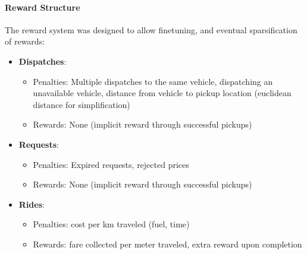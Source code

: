 \documentclass[11pt]{article}
\begin{document}
\paragraph{Reward Structure} The reward system was designed to allow finetuning, and eventual sparsification of rewards:
\begin{itemize}
		\item \textbf{Dispatches}:
				\begin{itemize}
						\item Penalties: Multiple dispatches to the same vehicle, dispatching an unavailable vehicle, distance
								from vehicle to pickup location (euclidean distance for simplification)
						\item Rewards: None (implicit reward through successful pickups)
				\end{itemize}
		\item \textbf{Requests}:
				\begin{itemize}
						\item Penalties: Expired requests, rejected prices
						\item Rewards: None (implicit reward through successful pickups)
				\end{itemize}
		\item \textbf{Rides}:
				\begin{itemize}
						\item Penalties: cost per km traveled (fuel, time)
						\item Rewards: fare collected per meter traveled, extra reward upon completion
				\end{itemize}
\end{itemize}
\end{document}
